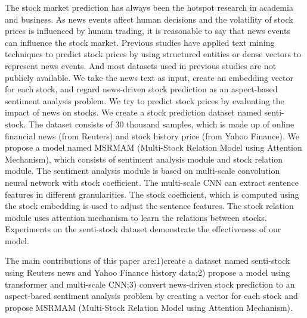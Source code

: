 \begin{eabstract}
  The stock market prediction has always been the hotspot research in academia and business. As news events affect human decisions and the volatility of stock prices is influenced by human trading, it is reasonable to say that news events can influence the stock market. Previous studies have applied text mining techniques to predict stock prices by using structured entities or dense vectors to represent news events. And most datasets used in previous studies are not publicly available. We take the news text as input, create an embedding vector for each stock, and regard news-driven stock prediction as an aspect-based sentiment analysis problem. We try to predict stock prices by evaluating the impact of news on stocks. We create a stock prediction dataset named senti-stock. The dataset consists of 30 thousand samples, which is made up of online financial news (from Reuters) and stock history price (from Yahoo Finance). We propose a model named MSRMAM (Multi-Stock Relation Model using Attention Mechanism), which consists of sentiment analysis module and stock relation module. The sentiment analysis module is based on multi-scale convolution neural network with stock coefficient. The multi-scale CNN can extract sentence features in different granularities. The stock coefficient, which is computed using the stock embedding is used to adjust the sentence features. The stock relation module uses attention mechanism to learn the relations between stocks. Experiments on the senti-stock dataset demonstrate the effectiveness of our model.
  
 
  The main contributions of this paper are:1)create a dataset named senti-stock using Reuters news and Yahoo Finance history data;2) propose a model using transformer and multi-scale CNN;3)  convert news-driven stock prediction to an aspect-based sentiment analysis problem by creating a vector for each stock and propose MSRMAM (Multi-Stock Relation Model using Attention Mechanism).
\end{eabstract}

